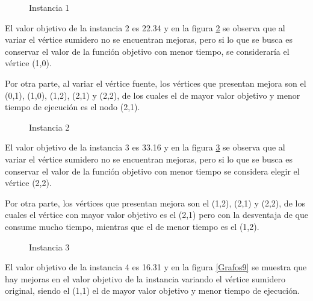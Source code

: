 \documentclass{article}
\begin{document}
\begin{figure}[H]
\centering
{}
\vspace{5mm}
\caption{Instancia 1} \label{Grafos6}
\end{figure}

El valor objetivo de la instancia 2 es 22.34 y en la figura \ref{Grafos7} se observa que al variar el vértice sumidero no se encuentran mejoras, pero si lo que se busca es conservar el valor de la función objetivo con menor tiempo, se consideraría el vértice (1,0).

Por otra parte, al variar el vértice fuente, los vértices que presentan mejora son el (0,1), (1,0), (1,2), (2,1) y (2,2), de los cuales el de mayor valor objetivo y menor tiempo de ejecución es el nodo (2,1).

\begin{figure}[H]
\centering
{}
\vspace{5mm}
\caption{Instancia 2} \label{Grafos7}
\end{figure}

El valor objetivo de la instancia 3 es 33.16 y en la figura \ref{Grafos8} se observa que al variar el vértice sumidero no se encuentran mejoras, pero si lo que se busca es conservar el valor de la función objetivo con menor tiempo se considera elegir el vértice (2,2).

Por otra parte, los vértices que presentan mejora son el (1,2), (2,1) y (2,2), de los cuales el vértice con mayor valor objetivo es el (2,1)  pero con la desventaja de que consume mucho tiempo, mientras que el de menor tiempo es el (1,2).
\begin{figure}[H]
\centering
{}
\vspace{5mm}
\caption{Instancia 3} \label{Grafos8}
\end{figure}
El valor objetivo de la instancia 4 es 16.31 y en la figura \ref{Grafos9} se muestra que hay mejoras en el valor objetivo de la instancia variando el vértice sumidero original, siendo el (1,1) el de mayor valor objetivo y menor tiempo de ejecución.
\end{document}
